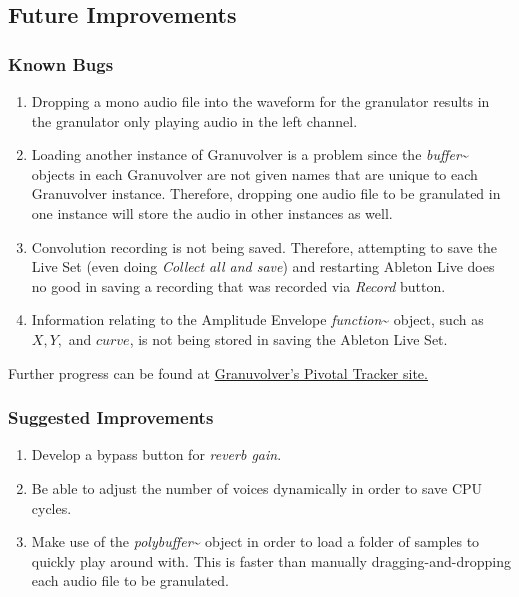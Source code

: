 \documentclass{article}
\begin{document}
		


		\subsection{Future Improvements}
			\subsubsection{Known Bugs}
				\begin{enumerate}
					\item Dropping a mono audio file into the waveform for the granulator results in the granulator only playing audio in the left channel.

					\item Loading another instance of Granuvolver is a problem since the \emph{buffer}\~{} objects in each Granuvolver are not given names that are unique to each Granuvolver instance.  Therefore, dropping one audio file to be granulated in one instance will store the audio in other instances as well.

					\item Convolution recording is not being saved.  Therefore, attempting to save the Live Set (even doing \emph{Collect all and save}) and restarting Ableton Live does no good in saving a recording that was recorded via \emph{Record} button.

					\item Information relating to the Amplitude Envelope \emph{function}\~{} object, such as $X,Y,$ and $curve$, is not being stored in saving the Ableton Live Set. 

				\end{enumerate}

				Further progress can be found at \href{https://www.pivotaltracker.com/s/projects/961764}{Granuvolver's Pivotal Tracker site.}

			\subsubsection{Suggested Improvements}
				\begin{enumerate}
					\item Develop a bypass button for \emph{reverb gain}.
					
					\item Be able to adjust the number of voices dynamically in order to save CPU cycles.
					
					\item Make use of the \emph{polybuffer}\~{} object in order to load a folder of samples to quickly play around with.  This is faster than manually dragging-and-dropping each audio file to be granulated.


				\end{enumerate}
\end{document}
